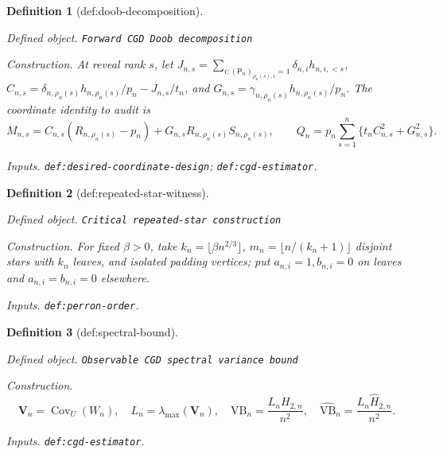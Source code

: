 \documentclass{article}
\newtheorem{definition}{Definition}
\begin{document}
\begin{definition}[def:doob-decomposition]\label{def:doob-decomposition}
\par\smallskip\noindent\emph{Defined object.} \texttt{Forward CGD Doob decomposition}
\par\smallskip\noindent\emph{Construction.} At reveal rank \(s\), let \(J_{n,s}=\sum_{i:(\mathsf P_n)_{\rho_n(s),i}=1}\delta_{n,i}h_{n,i,<s}\), \(C_{n,s}=\delta_{n,\rho_n(s)}h_{n,\rho_n(s)}/p_n-J_{n,s}/t_n\), and \(G_{n,s}=\gamma_{n,\rho_n(s)}h_{n,\rho_n(s)}/p_n\). The coordinate identity to audit is \[M_{n,s}=C_{n,s}(R_{n,\rho_n(s)}-p_n)+G_{n,s}R_{n,\rho_n(s)}S_{n,\rho_n(s)},\qquad Q_n=p_n\sum_{s=1}^n\{t_nC_{n,s}^2+G_{n,s}^2\}.\]
\par\smallskip\noindent\emph{Inputs.} \texttt{def:\allowbreak{}desired-\allowbreak{}coordinate-\allowbreak{}design}; \texttt{def:\allowbreak{}cgd-\allowbreak{}estimator}.
\end{definition}

\begin{definition}[def:repeated-star-witness]\label{def:repeated-star-witness}
\par\smallskip\noindent\emph{Defined object.} \texttt{Critical repeated-\allowbreak{}star construction}
\par\smallskip\noindent\emph{Construction.} For fixed \(\beta>0\), take \(k_n=\lfloor\beta n^{2/3}\rfloor\), \(m_n=\lfloor n/(k_n+1)\rfloor\) disjoint stars with \(k_n\) leaves, and isolated padding vertices; put \(a_{n,i}=1,b_{n,i}=0\) on leaves and \(a_{n,i}=b_{n,i}=0\) elsewhere.
\par\smallskip\noindent\emph{Inputs.} \texttt{def:\allowbreak{}perron-\allowbreak{}order}.
\end{definition}

\begin{definition}[def:spectral-bound]\label{def:spectral-bound}
\par\smallskip\noindent\emph{Defined object.} \texttt{Observable CGD spectral variance bound}
\par\smallskip\noindent\emph{Construction.} \[\mathbf V_n=\operatorname{Cov}_U(W_n),\quad L_n=\lambda_{\max}(\mathbf V_n),\quad \mathrm{VB}_n=\frac{L_nH_{2,n}}{n^2},\quad \widehat{\mathrm{VB}}_n=\frac{L_n\widehat H_{2,n}}{n^2}.\]
\par\smallskip\noindent\emph{Inputs.} \texttt{def:\allowbreak{}cgd-\allowbreak{}estimator}.
\end{definition}
\end{document}
